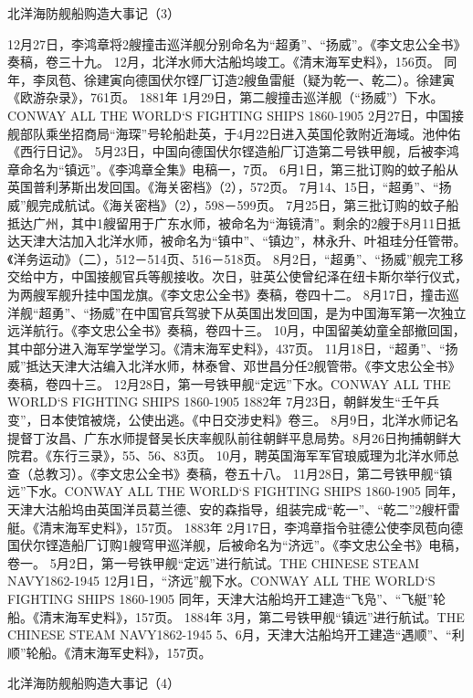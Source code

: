 \documentclass[12pt,UTF8]{ctexbook}
\begin{document}
北洋海防舰船购造大事记（3）

12月27日，李鸿章将2艘撞击巡洋舰分别命名为“超勇”、“扬威”。《李文忠公全书》奏稿，卷三十九。
12月，北洋水师大沽船坞竣工。《清末海军史料》，156页。
同年，李凤苞、徐建寅向德国伏尔铿厂订造2艘鱼雷艇（疑为乾一、乾二）。徐建寅《欧游杂录》，761页。
1881年
1月29日，第二艘撞击巡洋舰（“扬威”）下水。CONWAY ALL THE WORLD`S FIGHTING SHIPS 1860-1905
2月27日，中国接舰部队乘坐招商局“海琛”号轮船赴英，于4月22日进入英国伦敦附近海域。池仲佑《西行日记》。
5月23日，中国向德国伏尔铿造船厂订造第二号铁甲舰，后被李鸿章命名为“镇远”。《李鸿章全集》电稿一，7页。
6月1日，第三批订购的蚊子船从英国普利茅斯出发回国。《海关密档》（2），572页。
7月14、15日，“超勇”、“扬威”舰完成航试。《海关密档》（2），598－599页。
7月25日，第三批订购的蚊子船抵达广州，其中1艘留用于广东水师，被命名为“海镜清”。剩余的2艘于8月11日抵达天津大沽加入北洋水师，被命名为“镇中”、“镇边”，林永升、叶祖珪分任管带。《洋务运动》（二），512－514页、516－518页。
8月2日，“超勇”、“扬威”舰完工移交给中方，中国接舰官兵等舰接收。次日，驻英公使曾纪泽在纽卡斯尔举行仪式，为两艘军舰升挂中国龙旗。《李文忠公全书》奏稿，卷四十二。
8月17日，撞击巡洋舰“超勇”、“扬威”在中国官兵驾驶下从英国出发回国，是为中国海军第一次独立远洋航行。《李文忠公全书》奏稿，卷四十三。
10月，中国留美幼童全部撤回国，其中部分进入海军学堂学习。《清末海军史料》，437页。
11月18日，“超勇”、“扬威”抵达天津大沽编入北洋水师，林泰曾、邓世昌分任2舰管带。《李文忠公全书》奏稿，卷四十三。
12月28日，第一号铁甲舰“定远”下水。CONWAY ALL THE WORLD`S FIGHTING SHIPS 1860-1905
1882年
7月23日，朝鲜发生“壬午兵变”，日本使馆被烧，公使出逃。《中日交涉史料》卷三。
8月9日，北洋水师记名提督丁汝昌、广东水师提督吴长庆率舰队前往朝鲜平息局势。8月26日拘捕朝鲜大院君。《东行三录》，55、56、83页。
10月，聘英国海军军官琅威理为北洋水师总查（总教习）。《李文忠公全书》奏稿，卷五十八。
11月28日，第二号铁甲舰“镇远”下水。CONWAY ALL THE WORLD`S FIGHTING SHIPS 1860-1905
同年，天津大沽船坞由英国洋员葛兰德、安的森指导，组装完成“乾一”、“乾二”2艘杆雷艇。《清末海军史料》，157页。
1883年
2月17日，李鸿章指令驻德公使李凤苞向德国伏尔铿造船厂订购1艘穹甲巡洋舰，后被命名为“济远”。《李文忠公全书》电稿，卷一。
5月2日，第一号铁甲舰“定远”进行航试。THE CHINESE STEAM NAVY1862-1945 
12月1日，“济远”舰下水。CONWAY ALL THE WORLD`S FIGHTING SHIPS 1860-1905
同年，天津大沽船坞开工建造“飞凫”、“飞艇”轮船。《清末海军史料》，157页。
1884年
3月，第二号铁甲舰“镇远”进行航试。THE CHINESE STEAM NAVY1862-1945 
5、6月，天津大沽船坞开工建造“遇顺”、“利顺”轮船。《清末海军史料》，157页。




北洋海防舰船购造大事记（4）
\end{document}
